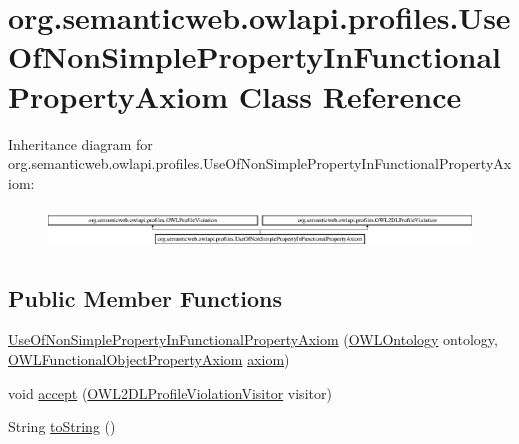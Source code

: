 \hypertarget{classorg_1_1semanticweb_1_1owlapi_1_1profiles_1_1_use_of_non_simple_property_in_functional_property_axiom}{\section{org.\-semanticweb.\-owlapi.\-profiles.\-Use\-Of\-Non\-Simple\-Property\-In\-Functional\-Property\-Axiom Class Reference}
\label{classorg_1_1semanticweb_1_1owlapi_1_1profiles_1_1_use_of_non_simple_property_in_functional_property_axiom}
}
Inheritance diagram for org.\-semanticweb.\-owlapi.\-profiles.\-Use\-Of\-Non\-Simple\-Property\-In\-Functional\-Property\-Axiom\-:\begin{figure}[H]
\begin{center}
\leavevmode
\includegraphics[height=1.117764cm]{classorg_1_1semanticweb_1_1owlapi_1_1profiles_1_1_use_of_non_simple_property_in_functional_property_axiom}
\end{center}
\end{figure}
\subsection*{Public Member Functions}
\begin{DoxyCompactItemize}
\item 
\hyperlink{classorg_1_1semanticweb_1_1owlapi_1_1profiles_1_1_use_of_non_simple_property_in_functional_property_axiom_a5f73e98bf9594ece131aacf1fba9d802}{Use\-Of\-Non\-Simple\-Property\-In\-Functional\-Property\-Axiom} (\hyperlink{interfaceorg_1_1semanticweb_1_1owlapi_1_1model_1_1_o_w_l_ontology}{O\-W\-L\-Ontology} ontology, \hyperlink{interfaceorg_1_1semanticweb_1_1owlapi_1_1model_1_1_o_w_l_functional_object_property_axiom}{O\-W\-L\-Functional\-Object\-Property\-Axiom} \hyperlink{classorg_1_1semanticweb_1_1owlapi_1_1profiles_1_1_o_w_l_profile_violation_aa7c8e8910ed3966f64a2c003fb516214}{axiom})
\item 
void \hyperlink{classorg_1_1semanticweb_1_1owlapi_1_1profiles_1_1_use_of_non_simple_property_in_functional_property_axiom_a7119fb87aa699b1fc8e991c69187d0fd}{accept} (\hyperlink{interfaceorg_1_1semanticweb_1_1owlapi_1_1profiles_1_1_o_w_l2_d_l_profile_violation_visitor}{O\-W\-L2\-D\-L\-Profile\-Violation\-Visitor} visitor)
\item 
String \hyperlink{classorg_1_1semanticweb_1_1owlapi_1_1profiles_1_1_use_of_non_simple_property_in_functional_property_axiom_acbb39d2a8d8749c4a56469801a078863}{to\-String} ()
\end{DoxyCompactItemize}



